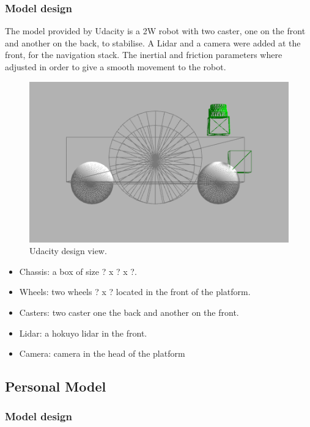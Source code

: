 \documentclass[10pt,journal,compsoc]{IEEEtran}
\begin{document}
\subsubsection{Model design}

The model provided by Udacity is a 2W robot with two caster, one on the front and another on the back, to stabilise. A Lidar and a camera were added at the front, for the navigation stack. The inertial and friction parameters where adjusted in order to give a smooth movement to the robot.

\begin{figure}[h]
\centering
\includegraphics[scale=0.33]{udacity-design-2}
\caption{Udacity design view.}
\label{fig:mesh1}
\end{figure}

\begin{itemize}
\item Chassis: a box of size ? x ? x ?.
\item Wheels: two wheels ? x ? located in the front of the platform.
\item Casters: two caster one the back and another on the front.
\item Lidar: a hokuyo lidar in the front.
\item Camera: camera in the head of the platform
\end{itemize}


\subsection{Personal Model}

\subsubsection{Model design}
\end{document}
